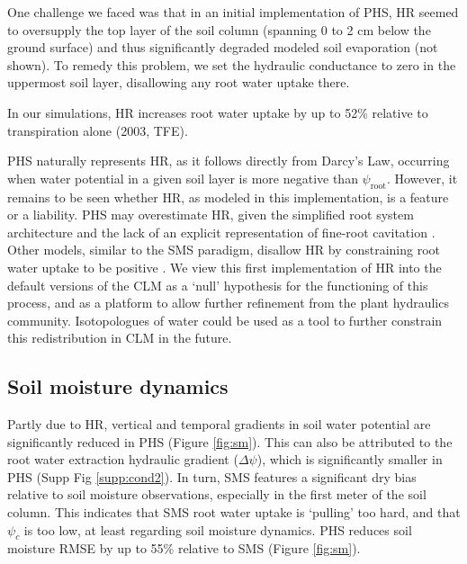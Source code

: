 \documentclass[draft,linenumbers]{agujournal}
\begin{document}
    One challenge we faced was that in an initial implementation of PHS, HR seemed to oversupply the top layer of the soil column (spanning 0 to 2 cm below the ground surface) and thus significantly degraded modeled soil evaporation (not shown). 
    To remedy this problem, we set the hydraulic conductance to zero in the uppermost soil layer, disallowing any root water uptake there.
    
    In our simulations, HR increases root water uptake by up to 52\% relative to transpiration alone (2003, TFE). 
    
    PHS naturally represents HR, as it follows directly from Darcy's Law, occurring when water potential in a given soil layer is more negative than $\psi_{\text{root}}$.
    However, it remains to be seen whether HR, as modeled in this implementation, is a feature or a liability.
    PHS may overestimate HR, given the simplified root system architecture \citep{bouda2017} 
    and the lack of an explicit representation of fine-root cavitation \citep{kotowska2015}.
    Other models, similar to the SMS paradigm, disallow HR by constraining root water uptake to be positive \citep{xu2016}.
    We view this first implementation of HR into the default versions of the CLM as a `null' hypothesis for the functioning of this process, and as a platform to allow further refinement from the plant hydraulics community. 
    Isotopologues of water could be used as a tool to further constrain this redistribution in CLM in the future. 

\subsection{Soil moisture dynamics}
    \label{sect:smt}

    Partly due to HR, vertical and temporal gradients in soil water potential are significantly reduced in PHS (Figure \ref{fig:sm}).
    This can also be attributed to the root water extraction hydraulic gradient ($\Delta\psi$), which is significantly smaller in PHS (Supp Fig \ref{supp:cond2}).
    In turn, SMS features a significant dry bias relative to soil moisture observations, especially in the first meter of the soil column.
    This indicates that SMS root water uptake is `pulling' too hard, and that $\psi_c$ is too low, at least regarding soil moisture dynamics.
    PHS reduces soil moisture RMSE by up to 55\% relative to SMS (Figure \ref{fig:sm}).
    
\end{document}
